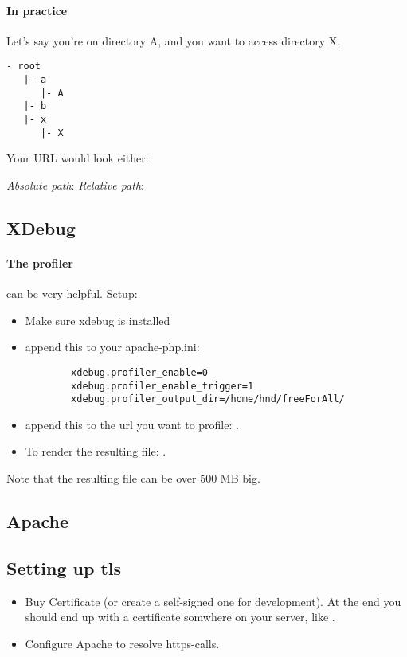 \paragraph{In practice} Let's say you're on directory A, and you want to access directory X.

\begin{lstlisting}
- root
   |- a
      |- A
   |- b
   |- x
      |- X
\end{lstlisting}
      
Your URL would look either:

\emph{Absolute path}: 
\emph{Relative path}: 





\subsection{XDebug}

\paragraph{The profiler} can be very helpful. Setup: 
\begin{itemize}
    \item Make sure xdebug is installed
    \item append this to your apache-php.ini:
        \begin{lstlisting}
        xdebug.profiler_enable=0
        xdebug.profiler_enable_trigger=1
        xdebug.profiler_output_dir=/home/hnd/freeForAll/
        \end{lstlisting}
    \item append this to the url you want to profile: .
    \item To render the resulting  file: .
\end{itemize}

Note that the resulting file can be over 500 MB big. 






\subsection{Apache}

\subsection{Setting up tls}
\begin{itemize}

    \item Buy Certificate (or create a self-signed one for development). At the end you should end up with a certificate somwhere on your server, like .
    
    \item Configure Apache to resolve https-calls. 
\end{itemize}

